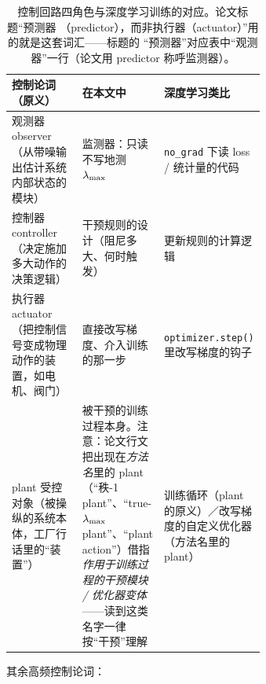 \begin{table}[!ht]
\centering\small
\caption{控制回路四角色与深度学习训练的对应。论文标题``预测器
（predictor），而非执行器（actuator）''用的就是这套词汇——标题的
``预测器''对应表中``观测器''一行（论文用 predictor 称呼监测器）。}
\label{tab:ch00-control}
\begin{tabular}{lp{0.30\linewidth}p{0.34\linewidth}}
\toprule
控制论词（原义） & 在本文中 & 深度学习类比 \\
\midrule
观测器 observer（从带噪输出估计系统内部状态的模块） & 监测器：只读不写地测 $\lambda_{\max}$ & \texttt{no\_grad} 下读 loss / 统计量的代码 \\
控制器 controller（决定施加多大动作的决策逻辑） & 干预规则的设计（阻尼多大、何时触发） & 更新规则的计算逻辑 \\
执行器 actuator（把控制信号变成物理动作的装置，如电机、阀门） & 直接改写梯度、介入训练的那一步 & \texttt{optimizer.step()} 里改写梯度的钩子 \\
plant 受控对象（被操纵的系统本体，工厂行话里的``装置''） & 被干预的训练过程本身。注意：论文行文把出现在\emph{方法名}里的 plant（``秩-1 plant''、``true-$\lambda_{\max}$ plant''、``plant action''）借指\emph{作用于训练过程的干预模块 / 优化器变体}——读到这类名字一律按``干预''理解 & 训练循环（plant 的原义）／改写梯度的自定义优化器（方法名里的 plant） \\
\bottomrule
\end{tabular}
\end{table}

其余高频控制论词：

